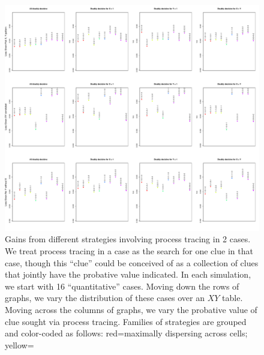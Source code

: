 \documentclass[12pt,]{book}
\begin{document}
\begin{figure}
\centering
\includegraphics{Figures/K2.pdf}
\caption{Gains from different strategies involving process tracing in 2 cases. We treat process tracing in a case as the search for one clue in that case, though this ``clue'' could be conceived of as a collection of clues that jointly have the probative value indicated. In each simulation, we start with 16 ``quantitative'' cases. Moving down the rows of graphs, we vary the distribution of these cases over an \(XY\) table. Moving across the columns of graphs, we vary the probative value of clue sought via process tracing. Families of strategies are grouped and color-coded as follows: red=maximally dispersing across cells; yellow=}
\end{figure}
\end{document}

